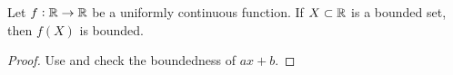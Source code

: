 \begin{theorem}
    Let $f: \mathbb{R} \rightarrow \mathbb{R}$ be a uniformly continuous function. If $X \subset \mathbb{R}$ is a bounded set, then $f(X)$ is bounded.
\end{theorem}
\begin{proof}
    Use  and check the boundedness of $ax+b$.
\end{proof}





































































































